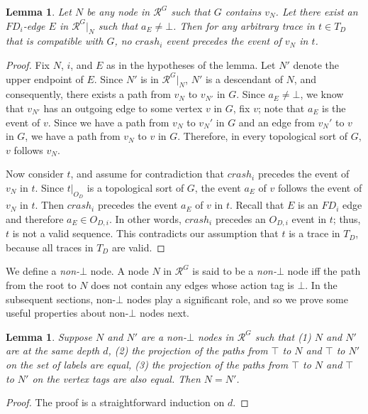 \documentclass[11pt]{article}
\numberwithin{theorem}{section}
\newtheorem{lemma}[theorem]{Lemma}
\begin{document}
\begin{lemma}\label{lem:noCrashIUntilBot}
 Let $N$ be any node in $\mathcal{R}^G$ such that $G$ contains $v_N$.
Let there exist an $FD_i$-edge $E$ in $\mathcal{R}^G|_N$ such that $a_E \neq \bot$. Then for any arbitrary trace in $t \in T_D$ that is compatible with $G$, no $crash_i$ event precedes the event of $v_N$ in $t$.
\end{lemma}
\begin{proof}
Fix $N$, $i$, and $E$ as in the hypotheses of the lemma. Let $N'$ denote the upper endpoint of $E$.
Since $N'$ is in $\mathcal{R}^G|_N$, $N'$ is a descendant of $N$, and consequently, there exists a path from $v_N$ to $v_{N'}$ in $G$. Since $a_E \neq \bot$, we know that $v_{N'}$ has an outgoing edge to some vertex $v$ in $G$, fix $v$; note that $a_E$ is the event of $v$. Since we have a path from $v_N$ to $v_N'$ in $G$ and an edge from $v_N'$ to $v$ in $G$, we have a path from $v_N$ to $v$ in $G$.
Therefore, in every topological sort of $G$, $v$ follows $v_N$.

Now consider $t$, and assume for contradiction that $crash_i$ precedes the event of $v_N$ in $t$.
Since $t|_{O_D}$ is a topological sort of $G$, the event $a_E$ of $v$ follows the event of $v_N$ in $t$.
Then $crash_i$ precedes the event $a_E$ of $v$ in $t$. Recall that $E$ is an $FD_i$ edge and therefore $a_E \in O_{D,i}$. In other words, $crash_i$ precedes an $O_{D,i}$ event in $t$; thus, $t$ is not a valid sequence. This contradicts our assumption that $t$ is a trace in $T_D$, because all traces in $T_D$ are valid.
\end{proof}

We define a \emph{non-$\bot$} node. A node $N$ in $\mathcal{R}^G$ is said to be a \emph{non-$\bot$} node iff the path from the root to $N$ does not contain any edges whose action tag is $\bot$. In the subsequent sections, non-$\bot$ nodes play a significant role, and so we prove some useful properties about non-$\bot$ nodes next.

\begin{lemma}\label{lem:nonBotNodeUniqueExe}
Suppose $N$ and $N'$ are a non-$\bot$ nodes in $\mathcal{R}^G$ such that (1) $N$ and $N'$ are at the same depth $d$,  (2) the projection of the paths from $\top$ to $N$ and $\top$ to $N'$ on the set of labels are equal, (3) the projection of  the paths from $\top$ to $N$ and $\top$ to $N'$ on the vertex tags are also equal. Then $N=N'$.
\end{lemma}
\begin{proof}
The proof is a straightforward induction on $d$.
\end{proof}
\end{document}
